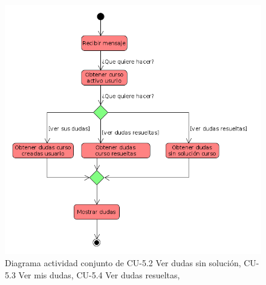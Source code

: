         \begin{figure}[!ht] %
\centering
\includegraphics[scale=0.3]{imagenes/diagramas/actividad/ver_dudas_sin_con_mis.png}  %

\caption{Diagrama actividad conjunto de CU-5.2 Ver dudas sin solución, CU-5.3 Ver mis dudas, CU-5.4 Ver dudas resueltas,}\label{figura1423}
\end{figure}


